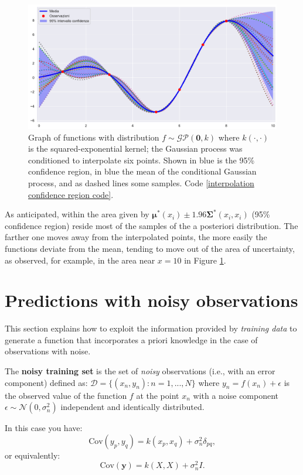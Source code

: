 \newpage
\begin{figure}[h]
    \centering
    \includegraphics[width=1\textwidth]{images/Gaussian process/Noise-free - mean&samples.pdf}
    \caption{Graph of functions with distribution $f\sim \mathcal{GP}(\bm{0},k)$ where $k(\cdot,\cdot)$ is the squared-exponential kernel; the Gaussian process was conditioned to interpolate six points. Shown in blue is the 95\% confidence region, in blue the mean of the conditional Gaussian process, and as dashed lines some samples. Code \ref{interpolation confidence region code}.}
    \label{Interpolation confidence region}
\end{figure}

As anticipated, within the area given by $\bm{\mu^*}(x_i)\pm 1.96\bm{\Sigma^*}(x_i,x_i)$ (95\% confidence region) reside most of the samples of the a posteriori distribution. The farther one moves away from the interpolated points, the more easily the functions deviate from the mean, tending to move out of the area of uncertainty, as observed, for example, in the area near $x=10$ in Figure \ref{Interpolation confidence region}.



\section{Predictions with noisy observations}\label{noisyPrediction}
This section explains how to exploit the information provided by \textit{training data} to generate a function that incorporates a priori knowledge in the case of observations with noise. \\

\begin{defi}
  The \textbf{noisy training set} is the set of \textit{noisy} observations (i.e., with an error component) defined as: $\mathcal{D}=\{(x_n,y_n): n=1,... ,N\}$ where $y_n=f(x_n)+\epsilon$ is the observed value of the function $f$ at the point $x_n$ with a noise component $\epsilon\sim \mathcal{N}(0,\sigma_n^2)$ independent and identically distributed. 
\end{defi}
In this case you have:
\[
\text{Cov}(y_p,y_q)=k(x_p,x_q)+\sigma_n^2 \delta_{pq},
\]
or equivalently:
\[
\text{Cov}(\mathbf{y})=k(X,X)+\sigma_n^2I.
\]

